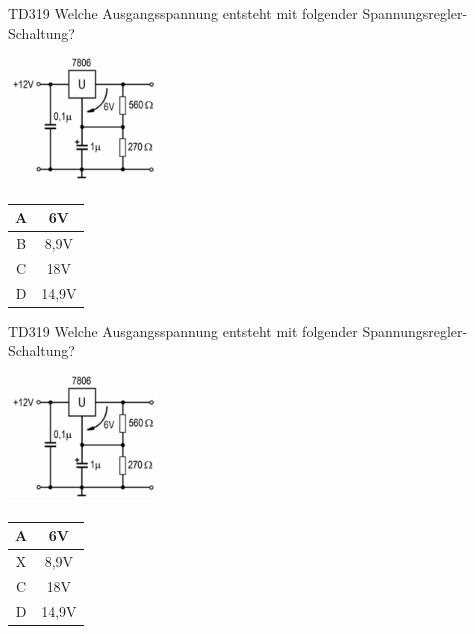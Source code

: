 \begin{frame}
    \begin{center} \Large
        \begin{block}{TD319}
		\large Welche Ausgangsspannung entsteht mit folgender Spannungsregler-Schaltung?\\
		\begin{center}
		\includegraphics[width=0.3\textwidth]{a17/TD319.png}\\
		\end{center}
    	\end{block}
        \begin{tabular}{|c|c|}
        \hline
        A & 6V \\ \hline
        B & 8,9V \\ \hline
        C & 18V \\ \hline
        D & 14,9V \\ \hline
        \end{tabular}
    \end{center}
\end{frame}
\begin{frame}
    \begin{center} \Large
        \begin{block}{TD319}
		\large Welche Ausgangsspannung entsteht mit folgender Spannungsregler-Schaltung?\\
		\begin{center}
		\includegraphics[width=0.3\textwidth]{a17/TD319.png}\\
		\end{center}
    	\end{block}
        \begin{tabular}{|c|c|}
        \hline
        A & 6V \\ \hline
        X & 8,9V \\ \hline
        C & 18V \\ \hline
        D & 14,9V \\ \hline
        \end{tabular}
    \end{center}
\end{frame}

